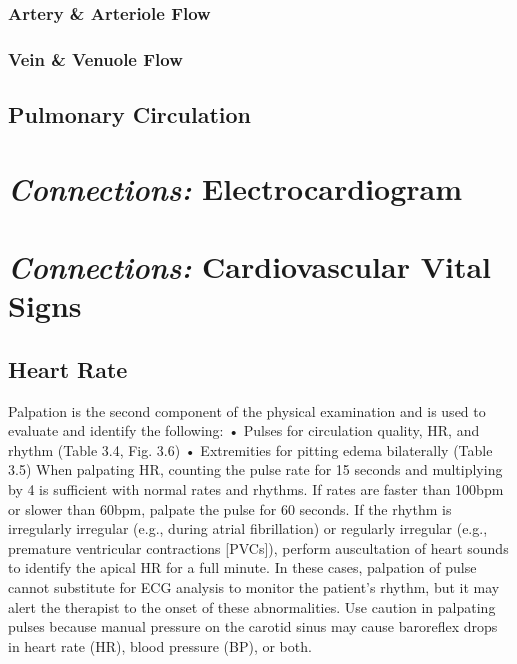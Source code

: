 \subsubsection{Artery \& Arteriole Flow}

\subsubsection{Vein \&  Venuole Flow}

\subsection{Pulmonary Circulation}


\section{\textit{Connections:} Electrocardiogram}

\section{\textit{Connections:} Cardiovascular Vital Signs}
\subsection{Heart Rate} 
Palpation is the second component of the physical examination and is used to evaluate and identify the following:
•	Pulses for circulation quality, HR, and rhythm (Table 3.4, Fig. 3.6)
•	Extremities for pitting edema bilaterally (Table 3.5)
When palpating HR, counting the pulse rate for 15 seconds and multiplying by 4 is sufficient with normal rates and rhythms. If rates are faster than 100bpm or slower than 60bpm, palpate the pulse for 60 seconds. If the rhythm is irregularly irregular (e.g., during atrial fibrillation) or regularly irregular (e.g., premature ventricular contractions [PVCs]), perform auscultation of heart sounds to identify the apical HR for a full minute. In these cases, palpation of pulse cannot substitute for ECG analysis to monitor the patient’s rhythm, but it may alert the therapist to the onset of these abnormalities.
Use caution in palpating pulses because manual pressure on the carotid sinus may cause baroreflex drops in heart rate (HR), blood pressure (BP), or both.

